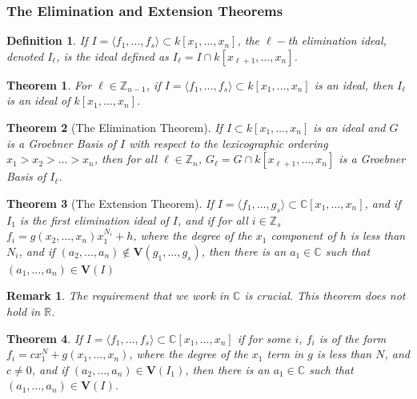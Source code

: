 \documentclass[oneside]{book}
\theoremstyle{mystyle}
\newtheorem{theorem}{Theorem}[section]
\newtheorem{definition}{Definition}[section]
\newtheorem{remark}{Remark}[section]
\begin{document}
\subsubsection{The Elimination and Extension Theorems}
\begin{definition}
If $I = \langle f_1,\hdots, f_s\rangle \subset k[x_1,\hdots ,x_n]$, the $\ell-$th elimination ideal, denoted $I_{\ell}$, is the ideal defined as $I_{\ell} = I \cap k[x_{\ell+1},\hdots, x_n]$.
\end{definition}
\begin{theorem}
For $\ell \in \mathbb{Z}_{n-1}$, if $I = \langle f_1,\hdots, f_s\rangle\subset k[x_1,\hdots ,x_n]$ is an ideal, then $I_{\ell}$ is an ideal of $k[x_1,\hdots ,x_n]$.
\end{theorem}
\begin{theorem}[The Elimination Theorem]
If $I\subset k[x_1,\hdots ,x_n]$ is an ideal and $G$ is a Groebner Basis of $I$ with respect to the lexicographic ordering $x_1>x_2>\hdots > x_n$, then for all $\ell \in \mathbb{Z}_{n}$, $G_{\ell} = G\cap k[x_{\ell+1},\hdots, x_n]$ is a Groebner Basis of $I_{\ell}$.
\end{theorem}
\begin{theorem}[The Extension Theorem]
If $I = \langle f_1,\hdots, g_s\rangle \subset \mathbb{C}[x_1,\hdots ,x_n]$, and if $I_1$ is the first elimination ideal of $I$, and if for all $i\in \mathbb{Z}_s$ $f_i = g(x_2,\hdots, x_n)x_1^{N_i}+h$, where the degree of the $x_1$ component of $h$ is less than $N_i$, and if $(a_2,\hdots, a_n)\notin \textbf{V}(g_1,\hdots, g_s)$, then there is an $a_1 \in \mathbb{C}$ such that $(a_1,\hdots, a_n)\in \textbf{V}(I)$
\end{theorem}
\begin{remark}
The requirement that we work in $\mathbb{C}$ is crucial. This theorem does not hold in $\mathbb{R}$. 
\end{remark}
\begin{theorem}
If $I = \langle f_1,\hdots, f_s\rangle \subset \mathbb{C}[x_1,\hdots, x_n]$ if for some $i$, $f_i$ is of the form $f_i = cx_1^N + g(x_1,\hdots, x_n)$, where the degree of the $x_1$ term in $g$ is less than $N$, and $c \ne 0$, and if $(a_2,\hdots, a_n) \in \textbf{V}(I_{1})$, then there is an $a_1 \in \mathbb{C}$ such that $(a_1,\hdots, a_n) \in \textbf{V}(I)$.
\end{theorem}
\end{document}
